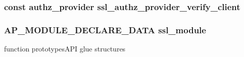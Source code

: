 \subsubsection[{\texorpdfstring{ssl\+\_\+authz\+\_\+provider\+\_\+verify\+\_\+client}{ssl_authz_provider_verify_client}}]{\setlength{\rightskip}{0pt plus 5cm}const {\bf authz\+\_\+provider} ssl\+\_\+authz\+\_\+provider\+\_\+verify\+\_\+client}\hypertarget{group__MOD__SSL__PRIVATE_gace916c60367df82e2df27b225a402960}{}\label{group__MOD__SSL__PRIVATE_gace916c60367df82e2df27b225a402960}
\subsubsection[{\texorpdfstring{ssl\+\_\+module}{ssl_module}}]{ {\bf A\+P\+\_\+\+M\+O\+D\+U\+L\+E\+\_\+\+D\+E\+C\+L\+A\+R\+E\+\_\+\+D\+A\+TA} ssl\+\_\+module}\hypertarget{group__MOD__SSL__PRIVATE_ga18f8469259ccdd0630b1a606a72ad31b}{}\label{group__MOD__SSL__PRIVATE_ga18f8469259ccdd0630b1a606a72ad31b}
function prototypes\+A\+PI glue structures 
